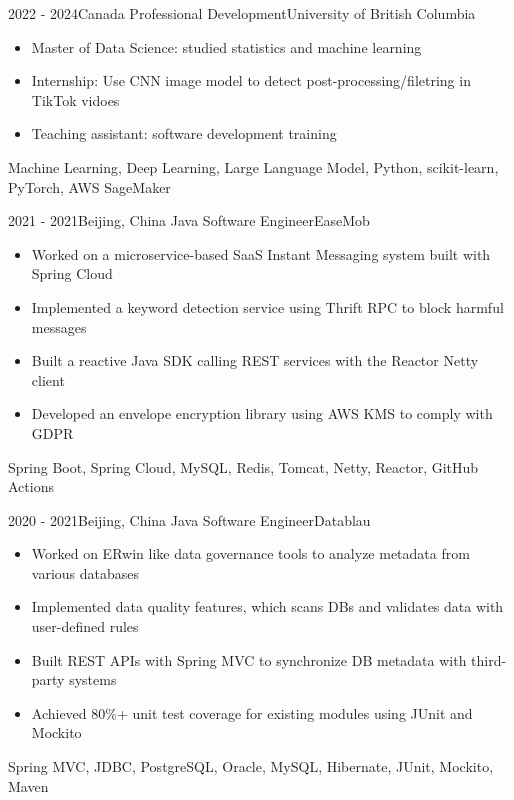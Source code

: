 \documentclass[localFont,alternative]{resume_template}
\begin{document}
    \begin{experiences}
    
    \experience
    {2022 - 2024}{Canada}
    {Professional Development}{University of British Columbia}
    {
        \begin{itemize}
        \item Master of Data Science: studied statistics and machine learning
        \item Internship: Use CNN image model to detect post-processing/filetring in TikTok vidoes
        \item Teaching assistant: software development training
        \end{itemize}
    }
    {Machine Learning, Deep Learning, Large Language Model, Python, scikit-learn, PyTorch, AWS SageMaker}
    
    \emptySeparator
    
    \experience
    {2021 - 2021}{Beijing, China}
    {Java Software Engineer}{EaseMob}
    {
        \begin{itemize}
        \item Worked on a microservice-based SaaS Instant Messaging system built with Spring Cloud
        \item Implemented a keyword detection service using Thrift RPC to block harmful messages
        \item Built a reactive Java SDK calling REST services with the Reactor Netty client
        \item Developed an envelope encryption library using AWS KMS to comply with GDPR
        \end{itemize}
    }
    {Spring Boot, Spring Cloud, MySQL, Redis, Tomcat, Netty, Reactor, GitHub Actions}
    
    \emptySeparator
    
    \experience
    {2020 - 2021}{Beijing, China}
    {Java Software Engineer}{Datablau}
    {
        \begin{itemize}
        \item Worked on ERwin like data governance tools to analyze metadata from various databases
        \item Implemented data quality features, which scans DBs and validates data with user-defined rules
        \item Built REST APIs with Spring MVC to synchronize DB metadata with third-party systems
        \item Achieved 80\%+ unit test coverage for existing modules using JUnit and Mockito
        \end{itemize}
    }
    {Spring MVC, JDBC, PostgreSQL, Oracle, MySQL, Hibernate, JUnit, Mockito, Maven}
    

\end{experiences}
\end{document}

